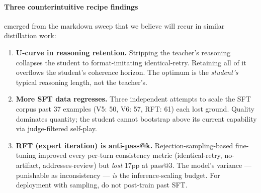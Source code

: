 \documentclass[11pt]{article}
\begin{document}
\paragraph{Three counterintuitive recipe findings} emerged from the markdown sweep that we believe will recur in similar distillation work:
\begin{enumerate}[leftmargin=*,topsep=0.2ex,itemsep=0.2ex]
  \item \textbf{U-curve in reasoning retention.} Stripping the teacher's reasoning collapses the student to format-imitating identical-retry. Retaining all of it overflows the student's coherence horizon. The optimum is the \emph{student's} typical reasoning length, not the teacher's.
  \item \textbf{More SFT data regresses.} Three independent attempts to scale the SFT corpus past 37 examples (V5: 50, V6: 57, RFT: 61) each lost ground. Quality dominates quantity; the student cannot bootstrap above its current capability via judge-filtered self-play.
  \item \textbf{RFT (expert iteration) is anti-pass@k.} Rejection-sampling-based fine-tuning improved every per-turn consistency metric (identical-retry, no-artifact, addresses-review) but \emph{lost} 17pp at pass@3. The model's variance --- punishable as inconsistency --- \emph{is} the inference-scaling budget. For deployment with sampling, do not post-train past SFT.
\end{enumerate}
\end{document}
